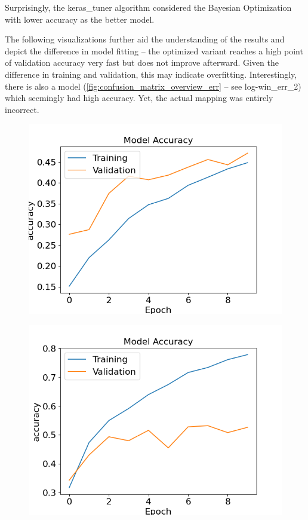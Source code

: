Surprisingly, the keras\_tuner algorithm considered the Bayesian Optimization with lower accuracy as the better model. 

The following visualizations further aid the understanding of the results and depict the difference in model fitting -- the optimized 
variant reaches a high point of validation accuracy very fast but does not improve afterward.
Given the difference in training and validation, this may indicate overfitting.
Interestingly, there is also a model (\ref{fig:confusion_matrix_overview_err} -- see log-win\_err\_2) which seemingly had high accuracy. Yet, the actual mapping was entirely incorrect.

\begin{figure}[H]
  \centering
  \begin{minipage}{.5\textwidth}
    \centering
    \includegraphics[width=1.0\linewidth]{img/training_history_standard.png}
    \label{fig:training_history_standard}
  \end{minipage}%
  \begin{minipage}{.5\textwidth}
    \centering
    \includegraphics[width=1.0\linewidth]{img/training_history_optimal.png}

\end{minipage}
\end{figure}
